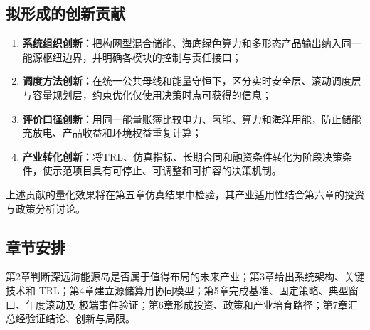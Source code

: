 \subsection{拟形成的创新贡献}

\begin{enumerate}
  \item \textbf{系统组织创新：}把构网型混合储能、海底绿色算力和多形态产品输出纳入同一能源枢纽边界，并明确各模块的控制与责任接口；
  \item \textbf{调度方法创新：}在统一公共母线和能量守恒下，区分实时安全层、滚动调度层与容量规划层，约束优化仅使用决策时点可获得的信息；
  \item \textbf{评价口径创新：}用同一能量账簿比较电力、氢能、算力和海洋用能，防止储能充放电、产品收益和环境权益重复计算；
  \item \textbf{产业转化创新：}将TRL、仿真指标、长期合同和融资条件转化为阶段决策条件，使示范项目具有可停止、可调整和可扩容的决策机制。
\end{enumerate}

上述贡献的量化效果将在第五章仿真结果中检验，其产业适用性结合第六章的投资与政策分析讨论。

\subsection{章节安排}

第2章判断深远海能源岛是否属于值得布局的未来产业；第3章给出系统架构、关键技术和
TRL；第4章建立源储算用协同模型；第5章完成基准、固定策略、典型窗口、年度滚动及
极端事件验证；第6章形成投资、政策和产业培育路径；第7章汇总经验证结论、创新与局限。


